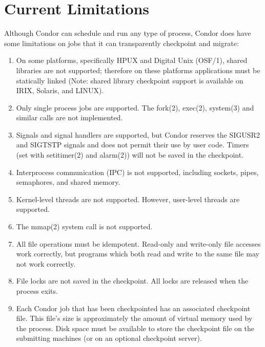 \section{\label{sec:current-limitations}Current Limitations}

\begin{description}

	\item[Limitations on Jobs which can Checkpointed] Although Condor can schedule and
run any type of process, Condor does have some limitations on jobs that it can
transparently checkpoint and migrate:
\begin{enumerate}
	\item On some platforms, specifically HPUX 
and Digital Unix
(OSF/1),
shared libraries are not supported; therefore on these
platforms applications must be statically linked (Note: shared library
checkpoint support is available on IRIX, Solaris, and LINUX). 
	\item Only single process jobs are supported. The fork(2),
exec(2),
system(3)
and similar calls are not implemented.
	\item Signals and signal handlers 
are supported, but Condor reserves the 
SIGUSR2 and SIGTSTP signals and does not permit their use by user code.
Timers (set with setitimer(2)
and
alarm(2))
will not be saved in the checkpoint.
	\item Interprocess communication (IPC) is not
supported, including 
sockets, 
pipes,
semaphores, 
and shared memory.
	\item Kernel-level threads are not supported.  However, user-level
threads are supported.
	\item The mmap(2)
system call is not supported.
	\item All file operations must be idempotent.
Read-only and write-only file accesses work correctly,
but programs which both read and write to the same file may not
work correctly.
	\item File locks
are not saved in the checkpoint.  All locks
are released when the process exits.
	\item Each Condor job that has been checkpointed has an associated 
checkpoint file.
This file's size is approximately the amount of virtual memory used by the 
process. Disk space must be available to store the checkpoint file on the 
submitting machines (or on an optional checkpoint server).
\end{enumerate}


\end{description}
